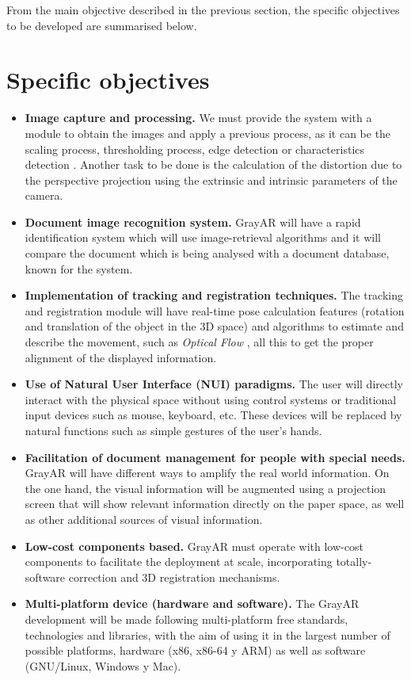From the main objective described in the previous section, the specific objectives to be developed are summarised below.
\section{Specific objectives}
\begin{itemize}
\item \textbf{Image capture and processing.} We must provide the system with a module to obtain the images and apply a previous process, as it can be the scaling process, thresholding process, edge detection or characteristics detection  \cite{Ortiz} \cite{Bay}. Another task to be done is the calculation of the distortion due to the perspective projection using the extrinsic and intrinsic parameters of the camera. 

\item \textbf{Document image recognition system.} GrayAR will have a rapid identification system which will use image-retrieval algorithms and it will compare the document which is being analysed with a document database, known for the system. 

\item \textbf{Implementation of tracking and registration techniques.}
The tracking and registration module will have real-time pose calculation features (rotation and translation of the object in the 3D space) and algorithms to estimate and describe the movement, such as \textit{Optical Flow} \cite{LKanade}, all this to get the proper alignment of the displayed information.

\item \textbf{Use of Natural User Interface (NUI) paradigms.}
The user will directly interact with the physical space without using control systems or traditional input devices such as mouse, keyboard, etc. These devices will be replaced by natural functions such as simple gestures of the user’s hands. 

\item \textbf{Facilitation of document management for people with special needs.} GrayAR will have different ways to amplify the real world information. On the one hand, the visual information will be augmented using a projection screen that will show relevant information directly on the paper space, as well as other additional sources of visual information. 

\item \textbf{Low-cost components based.} GrayAR must operate with low-cost components to facilitate the deployment at scale, incorporating totally-software correction and 3D registration mechanisms. 

\item \textbf{Multi-platform device (hardware and software).} The GrayAR development will be made following multi-platform free standards, technologies and libraries, with the aim of using it in the largest number of possible platforms, hardware (x86, x86-64 y ARM) as well as software (GNU/Linux, Windows y Mac).
\end{itemize}